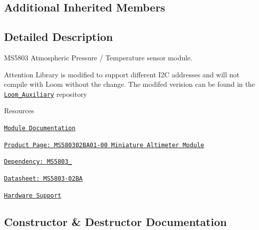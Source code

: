 \subsection*{Additional Inherited Members}


\subsection{Detailed Description}
M\+S5803 Atmospheric Pressure / Temperature sensor module. 

\begin{DoxyAttention}{Attention}
Library is modified to support different I2C addresses and will not compile with Loom without the change. The modifed verision can be found in the \href{https://github.com/OPEnSLab-OSU/Loom_Auxiliary/blob/master/Dependencies/Dependencies_Individual/MS5803_02.zip}{\tt Loom\+\_\+\+Auxiliary} repository
\end{DoxyAttention}
\begin{DoxyParagraph}{Resources}

\begin{DoxyItemize}
\item \href{https://openslab-osu.github.io/Loom/html/class_loom___m_s5803.html}{\tt Module Documentation}
\item \href{https://www.digikey.com/product-detail/en/te-connectivity-measurement-specialties/MS580302BA01-00/223-1624-5-ND/5277629}{\tt Product Page\+: M\+S580302\+B\+A01-\/00 Miniature Altimeter Module}
\item \href{https://github.com/millerlp/MS5803_02}{\tt Dependency\+: M\+S5803\+\_}
\item \href{https://www.te.com/commerce/DocumentDelivery/DDEController?Action=srchrtrv&DocNm=MS5803-02BA&DocType=Data+Sheet&DocLang=English}{\tt Datasheet\+: M\+S5803-\/02\+BA}
\item \href{https://github.com/OPEnSLab-OSU/Loom/wiki/Hardware-Support#ms5803-atmospheric-pressure--temperature-sensor}{\tt Hardware Support} 
\end{DoxyItemize}
\end{DoxyParagraph}


\subsection{Constructor \& Destructor Documentation}

